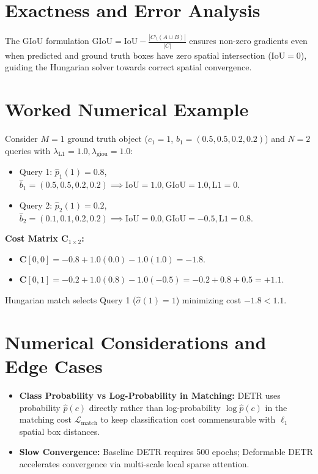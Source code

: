 \documentclass[11pt,a4paper]{article}
\theoremstyle{definition}
\begin{document}
\section{Exactness and Error Analysis}

The GIoU formulation $\text{GIoU} = \text{IoU} - \frac{|C \setminus (A \cup B)|}{|C|}$ ensures non-zero gradients even when predicted and ground truth boxes have zero spatial intersection ($\text{IoU} = 0$), guiding the Hungarian solver towards correct spatial convergence.

\section{Worked Numerical Example}

Consider $M=1$ ground truth object ($c_1 = 1$, $b_1 = (0.5, 0.5, 0.2, 0.2)$) and $N=2$ queries with $\lambda_{\text{L1}} = 1.0, \lambda_{\text{giou}} = 1.0$:
\begin{itemize}
    \item Query 1: $\hat{p}_1(1) = 0.8$, $\hat{b}_1 = (0.5, 0.5, 0.2, 0.2) \implies \text{IoU}=1.0, \text{GIoU}=1.0, \text{L1}=0$.
    \item Query 2: $\hat{p}_2(1) = 0.2$, $\hat{b}_2 = (0.1, 0.1, 0.2, 0.2) \implies \text{IoU}=0.0, \text{GIoU}=-0.5, \text{L1}=0.8$.
\end{itemize}

\textbf{Cost Matrix $\mathbf{C}_{1 \times 2}$:}
\begin{itemize}
    \item $\mathbf{C}[0, 0] = -0.8 + 1.0(0.0) - 1.0(1.0) = -1.8$.
    \item $\mathbf{C}[0, 1] = -0.2 + 1.0(0.8) - 1.0(-0.5) = -0.2 + 0.8 + 0.5 = +1.1$.
\end{itemize}

Hungarian match selects Query 1 ($\hat{\sigma}(1) = 1$) minimizing cost $-1.8 < 1.1$.

\section{Numerical Considerations and Edge Cases}

\begin{itemize}
    \item \textbf{Class Probability vs Log-Probability in Matching:} DETR uses probability $\hat{p}(c)$ directly rather than log-probability $\log \hat{p}(c)$ in the matching cost $\mathcal{L}_{\text{match}}$ to keep classification cost commensurable with $\ell_1$ spatial box distances.
    \item \textbf{Slow Convergence:} Baseline DETR requires 500 epochs; Deformable DETR accelerates convergence via multi-scale local sparse attention.
\end{itemize}
\end{document}
